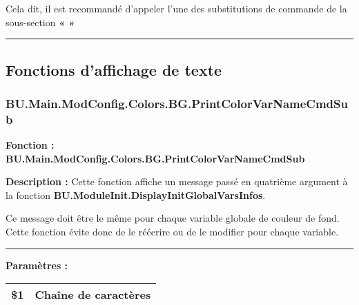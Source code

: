 \documentclass[a4paper,10pt]{article}
\begin{document}
    \begin{justify}
        Cela dit, il est recommandé d'appeler l'une des substitutions de commande de la sous-section \textbf{\color{sec2}«  »}
    \end{justify}







    \color{sec2}\par\noindent\rule{\textwidth}{0.4pt}\color{text}

    \color{sec2}
    \subsection{Fonctions d'affichage de texte}\color{text}

    \color{sec3}
    \subsubsection{BU.Main.ModConfig.Colors.BG.PrintColorVarNameCmdSub}\color{text}

    \begin{justify}
        \textbf{Fonction : \color{func}BU.Main.ModConfig.Colors.BG.PrintColorVarNameCmdSub}
    \end{justify}

    \begin{justify}
        \textbf{Description :} Cette fonction affiche un message passé en quatrième argument à la fonction \textbf{\color{func}BU.ModuleInit.DisplayInitGlobalVarsInfos}.
    \end{justify}

    \begin{justify}
        Ce message doit être le même pour chaque variable globale de couleur de fond. Cette fonction évite donc de le réécrire ou de le modifier pour chaque variable.
    \end{justify}


    \par\noindent\rule{\textwidth}{0.4pt}

    \begin{justify}
        \textbf{Paramètres :}

        \begin{tabular}{|l|l|}
            \hline
            \textbf{\color{vars}\$1} & Chaîne de caractères\\
            \hline
        \end{tabular}
    \end{justify}
\end{document}

